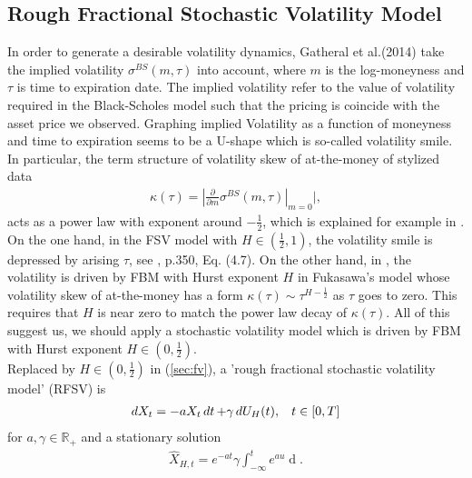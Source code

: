 \documentclass[a4paper, twoside, 11pt]{article}
\theoremstyle{definition}
\begin{document}
\subsection{Rough Fractional Stochastic Volatility Model}
In order to generate a desirable volatility dynamics, Gatheral et al.(2014) take the implied volatility $\sigma^{BS}(m, \tau)$ into account, where $m$ is the log-moneyness and $\tau$ is time to expiration date. The implied volatility refer to the value of volatility required in the Black-Scholes model such that the pricing is coincide with the asset price we observed.  Graphing implied Volatility as a function of moneyness and time to expiration seems to be a U-shape which is so-called volatility smile. In particular, the term structure of volatility skew of at-the-money of stylized data
\begin{eqnarray*}
  \kappa(\tau)=|\frac{\partial}{\partial m}\sigma^{BS}(m, \tau)|_{m=0}|,
\end{eqnarray*}
acts as a power law with exponent around $-\frac{1}{2}$, which is explained for example in \cite{gradin}. On the one hand, in the FSV model with $H \in (\frac{1}{2}, 1)$, the volatility smile is depressed by arising $\tau$, see \cite{comteetla}, p.350, Eq. (4.7). On the other hand,  in \cite{fukasawa}, the volatility is driven by FBM with Hurst exponent $H$ in Fukasawa's model whose volatility skew of at-the-money has a form $\kappa(\tau) \sim \tau^{H-\frac{1}{2}}$ as $\tau$ goes to zero. This requires that $H$ is near zero to match the power law decay of $\kappa(\tau)$.  All of this suggest us, we should apply a stochastic volatility model which is driven by FBM with Hurst exponent $H \in (0, \frac{1}{2})$.\\
Replaced by $H \in (0, \frac{1}{2})$ in (\ref{sec:fv}), a 'rough fractional stochastic volatility model' (RFSV) is
\begin{eqnarray}
  \mathop{dX_t} = -a X_t \mathop{dt} + \gamma \mathop{dU_H(t)},\hspace{3mm} t\in[0, T]
  \label{sec:rfm}
\end{eqnarray}
for $a,\gamma \in \mathbb{R}_+$ and a stationary solution
\begin{eqnarray}
\hat{X}_{H,t}=e^{-at}\gamma\int_{-\infty}^t e^{au}\mathop{dU_H(u)}.
\label{sec:rfm2}
\end{eqnarray}
\end{document}

